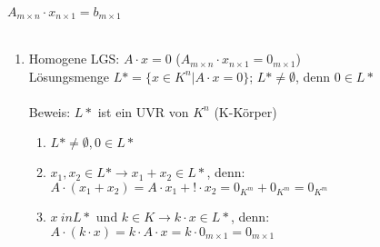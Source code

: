 \documentclass{scrartcl}
\begin{document}
	
	$A_{m \times n} \cdot x_{n \times 1} = b_{m \times 1}$
	\\
	\\
	\begin{enumerate}
		\item
		Homogene LGS: $A \cdot x = 0$ ($A_{m \times n} \cdot x_{n \times 1} = 0_{m \times 1}$)\\
		Lösungsmenge $L* = \{ x \in K^n \vert A\cdot x = 0 \}$; $L* \not = \emptyset$, denn $0 \in L*$\\\\
		Beweis: $L*$ ist ein UVR von $K^n$ (K-Körper)
		\begin{enumerate}
			\item
			$L* \not = \emptyset, 0 \in L*$
			\item
			$x_1,x_2 \in L* \rightarrow x_1 + x_2 \in L*$, denn:\\
			$A \cdot (x_1 + x_2) = A \cdot x_1 + ! \cdot x_2 = 0_{K^m}+0_{K^m} = 0_{K^m}$
			\item
			$x \ in L*$ und $k \in K \rightarrow k \cdot x \in L*$, denn:\\
			$A\cdot (k \cdot x) = k \cdot A \cdot x = k \cdot 0_{m \times 1} = 0_{m \times 1}$
		\end{enumerate}
	

\end{enumerate}
\end{document}
